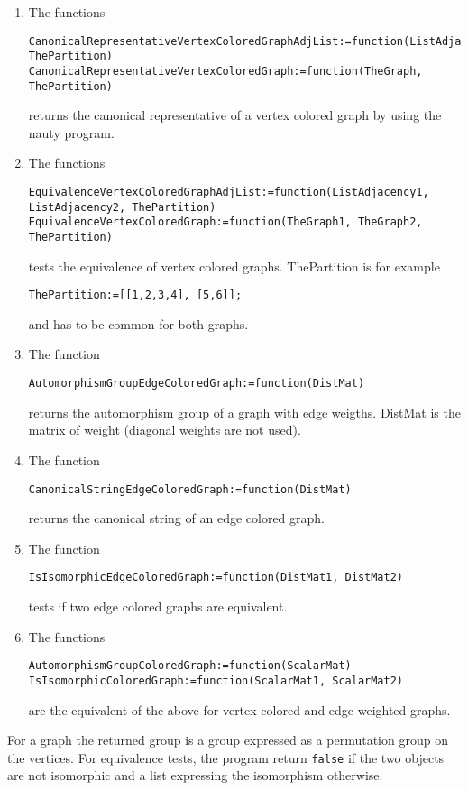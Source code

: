 \documentclass[12pt]{amsart}
\begin{document}
\begin{enumerate}
\item The functions
\begin{verbatim}
CanonicalRepresentativeVertexColoredGraphAdjList:=function(ListAdjacency, ThePartition)
CanonicalRepresentativeVertexColoredGraph:=function(TheGraph, ThePartition)
\end{verbatim}
returns the canonical representative of a vertex colored graph by using the
nauty program.
\item The functions
\begin{verbatim}
EquivalenceVertexColoredGraphAdjList:=function(ListAdjacency1, ListAdjacency2, ThePartition)
EquivalenceVertexColoredGraph:=function(TheGraph1, TheGraph2, ThePartition)
\end{verbatim}
tests the equivalence of vertex colored graphs. ThePartition is for example
\begin{verbatim}
ThePartition:=[[1,2,3,4], [5,6]];
\end{verbatim}
and has to be common for both graphs.
\item The function
\begin{verbatim}
AutomorphismGroupEdgeColoredGraph:=function(DistMat)
\end{verbatim}
returns the automorphism group of a graph with edge weigths. DistMat is the matrix of weight (diagonal weights are not used).
\item The function
\begin{verbatim}
CanonicalStringEdgeColoredGraph:=function(DistMat)
\end{verbatim}
returns the canonical string of an edge colored graph.
\item The function
\begin{verbatim}
IsIsomorphicEdgeColoredGraph:=function(DistMat1, DistMat2)
\end{verbatim}
tests if two edge colored graphs are equivalent.
\item The functions
\begin{verbatim}
AutomorphismGroupColoredGraph:=function(ScalarMat)
IsIsomorphicColoredGraph:=function(ScalarMat1, ScalarMat2)
\end{verbatim}
are the equivalent of the above for vertex colored and edge weighted graphs.

\end{enumerate}
For a graph the returned group is a group expressed as a permutation group
on the vertices. For equivalence tests, the program return {\tt false} if
the two objects are not isomorphic and a list expressing the isomorphism
otherwise.
\end{document}
